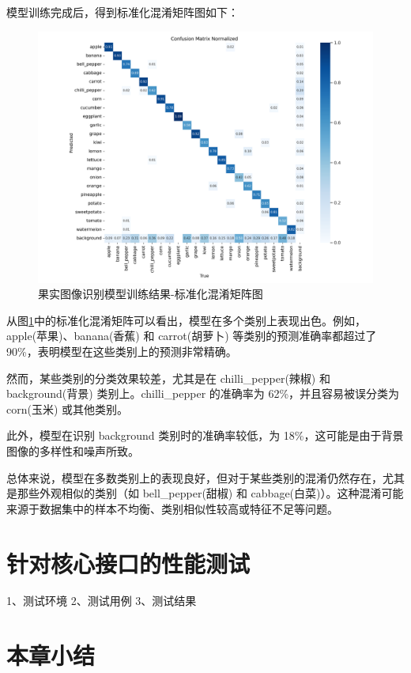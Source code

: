 模型训练完成后，得到标准化混淆矩阵图如下：

\begin{figure}[H]
    \centering
    \includegraphics[width=0.8\linewidth]{../source/aws-img/yolov8/out/image/confusion_matrix_normalized.png}
    \caption{果实图像识别模型训练结果-标准化混淆矩阵图}
    \label{fig:confusion_matrix_normalized}
\end{figure}

从图\ref{fig:confusion_matrix_normalized}中的标准化混淆矩阵可以看出，模型在多个类别上表现出色。例如，apple(苹果)、banana(香蕉) 和 carrot(胡萝卜) 等类别的预测准确率都超过了 90\%，表明模型在这些类别上的预测非常精确。

然而，某些类别的分类效果较差，尤其是在 chilli\_pepper(辣椒) 和 background(背景) 类别上。chilli\_pepper 的准确率为 62\%，并且容易被误分类为 corn(玉米) 或其他类别。

此外，模型在识别 background 类别时的准确率较低，为 18\%，这可能是由于背景图像的多样性和噪声所致。

总体来说，模型在多数类别上的表现良好，但对于某些类别的混淆仍然存在，尤其是那些外观相似的类别（如 bell\_pepper(甜椒) 和 cabbage(白菜)）。这种混淆可能来源于数据集中的样本不均衡、类别相似性较高或特征不足等问题。

\section{针对核心接口的性能测试}\label{sec:test-performance}

1、测试环境
2、测试用例
3、测试结果

\section{本章小结}